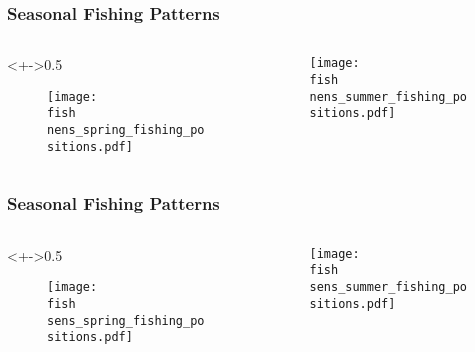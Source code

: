 \documentclass{beamer}
\newcommand{\fish}{C:/Rsaves/fishery/2017/}
\begin{document}
\begin{frame}
\frametitle{Seasonal Fishing Patterns}

\begin{columns}
\begin{column}<+->{0.5\textwidth}
 \vspace*{-0.5cm}
\begin{figure}
\centerline{\texttt{[image: \\fish nens\_spring\_fishing\_positions.pdf]}}

\end{figure}
\end{column}

\begin{column}{0.5\textwidth}
\begin{figure}
 \vspace*{-0.5cm}

\centerline{\texttt{[image: \\fish nens\_summer\_fishing\_positions.pdf]}}

 \end{figure}

\end{column}
\end{columns}

\end{frame}



\begin{frame}
\frametitle{Seasonal Fishing Patterns}

\begin{columns}
\begin{column}<+->{0.5\textwidth}
 \vspace*{-0.5cm}
\begin{figure}
\centerline{\texttt{[image: \\fish sens\_spring\_fishing\_positions.pdf]}}

\end{figure}
\end{column}

\begin{column}{0.5\textwidth}
\begin{figure}
 \vspace*{-0.5cm}

\centerline{\texttt{[image: \\fish sens\_summer\_fishing\_positions.pdf]}}

 \end{figure}

\end{column}
\end{columns}

\end{frame}
\end{document}
